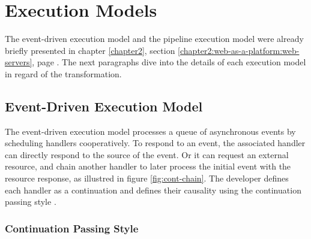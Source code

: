 \section{Execution Models} \label{chapter4:execution-models}

The event-driven execution model and the pipeline execution model were already briefly presented in chapter \ref{chapter2}, section \ref{chapter2:web-as-a-platform:web-servers}, page \pageref{chapter2:web-as-a-platform:web-servers}.
The next paragraphs dive into the details of each execution model in regard of the transformation.

\subsection{Event-Driven Execution Model} \label{chapter4:event-driven}

The event-driven execution model processes a queue of asynchronous events by scheduling handlers cooperatively.
To respond to an event, the associated handler can directly respond to the source of the event.
Or it can request an external resource, and chain another handler to later process the initial event with the resource response, as illustred in figure \ref{fig:cont-chain}.
The developer defines each handler as a continuation and defines their causality using the continuation passing style \cite{Wand1980,Haynes1984}.


\begin{figure}
\end{figure}

\subsubsection{Continuation Passing Style} \label{chapter4:event-loop:continuation}


